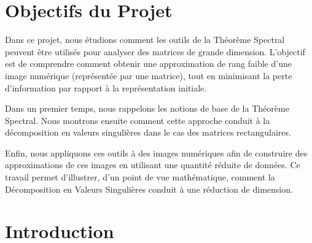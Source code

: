 \documentclass[12pt]{report}
\begin{document}

\tableofcontents
\clearpage




\section*{Objectifs du Projet}
Dans ce projet, nous étudions comment les outils de la Théorème Spectral peuvent être utilisés pour analyser des matrices de grande dimension. L’objectif est de comprendre comment obtenir une approximation de rang faible d'une image numérique (représentée par une matrice), tout en minimisant la perte d'information par rapport à la représentation initiale.

Dans un premier temps, nous rappelons les notions de base de la Théorème Spectral. Nous montrons ensuite comment cette approche conduit à la décomposition en valeurs singulières dans le cas des matrices rectangulaires.

Enfin, nous appliquons ces outils à des images numériques afin de construire des approximations de ces images en utilisant une quantité réduite de données. Ce travail permet d’illustrer, d’un point de vue mathématique, comment la Décomposition en Valeurs Singulières conduit à une réduction de dimension.

\section*{Introduction}
\end{document}
